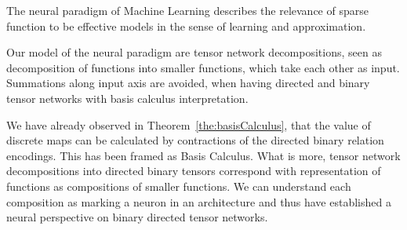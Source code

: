 
The neural paradigm of Machine Learning describes the relevance of sparse function to be effective models in the sense of learning and approximation.

Our model of the neural paradigm are tensor network decompositions, seen as decomposition of functions into smaller functions, which take each other as input.
Summations along input axis are avoided, when having directed and binary tensor networks with basis calculus interpretation.

We have already observed in Theorem~\ref{the:basisCalculus}, that the value of discrete maps can be calculated by contractions of the directed binary relation encodings.
This has been framed as Basis Calculus.
What is more, tensor network decompositions into directed binary tensors correspond with representation of functions as compositions of smaller functions.
We can understand each composition as marking a neuron in an architecture and thus have established a neural perspective on binary directed tensor networks.
